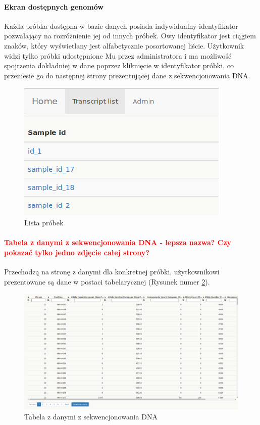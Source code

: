 \documentclass[a4paper,12pt,twoside]{article}
\begin{document}
\paragraph{Ekran dostępnych genomów}
Każda próbka dostępna w bazie danych posiada indywidualny identyfikator pozwalający na 
rozróżnienie jej od innych próbek. Owy identyfikator jest ciągiem znaków, który wyświetlany jest 
alfabetycznie posortowanej liście. Użytkownik widzi tylko próbki udostępnione Mu przez administratora
i ma możliwość spojrzenia dokładniej w dane poprzez kliknięcie w identyfikator próbki,
co przeniesie go do następnej strony prezentującej dane z sekwencjonowania DNA. 
\newline
 
\begin{figure}[h!]
  \includegraphics[width=\linewidth]{obrazy/aplikacja/sample_list.png}
  \caption{Lista próbek}
  \label{fig:sample_listpic}
\end{figure}

\newpage
\paragraph{\textcolor{red}{
Tabela z danymi z sekwencjonowania DNA - lepsza nazwa? Czy pokazać tylko jedno zdjęcie całej strony?}
}
Przechodzą na stronę z danymi dla konkretnej próbki, użytkownikowi prezentowane są 
dane w postaci tabelarycznej (Rysunek numer \ref{fig:table1pic}).

\begin{figure}[h!]
  \includegraphics[width=\linewidth]{obrazy/aplikacja/table1.png}
  \caption{Tabela z danymi z sekwencjonowania DNA}
  \label{fig:table1pic}
\end{figure}
\end{document}
